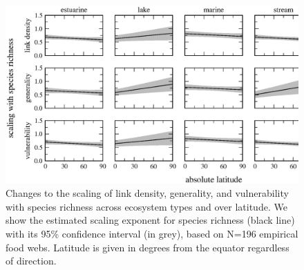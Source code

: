 \documentclass[12pt]{article}
\begin{document}
\begin{figure}[h]
\centerline{\includegraphics*[width=.85\textwidth]{Figures/by_TL/marginal/S_marginal_latitude_non_TS_corrected.eps}}
\caption{Changes to the scaling of link density, generality, and vulnerability with species richness across ecosystem
types and over latitude. We show the estimated scaling exponent for species richness (black
line) with its 95\% confidence interval (in grey), based on N=196 empirical food webs.
Latitude is given in degrees from the equator regardless of direction.} \label{S} \end{figure}
\end{document}
